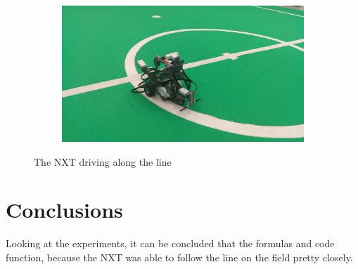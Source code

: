 \documentclass[12pt]{article}
\begin{document}
\begin{figure}[h!]
    ~ 
    \begin{subfigure}[b]{0.3\textwidth}
            \includegraphics[width=\textwidth]{lijn3.jpg}
    \end{subfigure}
    \caption{The NXT driving along the line}
    \label{driveline}
\end{figure}
\section{Conclusions}
Looking at the experiments, it can be concluded that the formulas and code function, because the NXT was able to follow the line on the field pretty closely.
\end{document}
